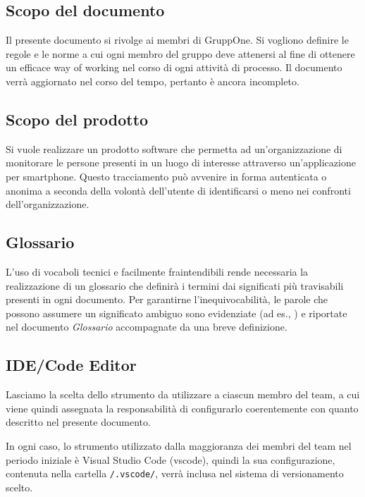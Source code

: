 \documentclass[../norme-di-progetto.tex]{subfiles}
\begin{document}
\subsection{Scopo del documento}%
\label{sub:scopo_del_documento}

Il presente documento si rivolge ai membri di GruppOne.
Si vogliono definire le regole e le norme a cui ogni membro del gruppo deve attenersi al fine di ottenere un efficace way of working nel corso di ogni attività di processo.
Il documento verrà aggiornato nel corso del tempo, pertanto è ancora incompleto.

\subsection{Scopo del prodotto}%
\label{sub:scopo_del_prodotto}

Si vuole realizzare un prodotto software che permetta ad un'organizzazione di monitorare le persone presenti in un luogo di interesse attraverso un'applicazione per smartphone.
Questo tracciamento può avvenire in forma autenticata o anonima a seconda della volontà dell'utente di identificarsi o meno nei confronti dell'organizzazione.

\subsection{Glossario}%
\label{sub:glossario}

L'uso di vocaboli tecnici e facilmente fraintendibili rende necessaria la realizzazione di un glossario che definirà i termini dai significati più travisabili presenti in ogni documento.
Per garantirne l'inequivocabilità, le parole che possono assumere un significato ambiguo sono evidenziate (ad es., ) e riportate nel documento \textit{Glossario} accompagnate da una breve definizione.

\subsection{IDE/Code Editor}%
\label{sub:ide_code_editor}

Lasciamo la scelta dello strumento da utilizzare a ciascun membro del team, a cui viene quindi assegnata la responsabilità di configurarlo coerentemente con quanto descritto nel presente documento.

In ogni caso, lo strumento utilizzato dalla maggioranza dei membri del team nel periodo iniziale è Visual Studio Code (vscode), quindi la sua configurazione, contenuta nella cartella \verb|/.vscode/|, verrà inclusa nel sistema di versionamento scelto.
\end{document}
